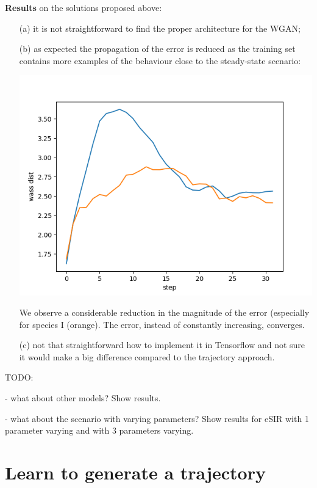 \documentclass{article}
\begin{document}
\textbf{Results} on the solutions proposed above:
\begin{itemize}
    \item[(a)] it is not straightforward to find the proper architecture for the WGAN;
    \item[(b)] as expected the propagation of the error is reduced as the training set contains more examples of the behaviour close to the steady-state scenario:
    \begin{center}
        \includegraphics[scale = 0.4]{img/ENRICH_10ep_avg_wass_distance_32steps.png}
    \end{center}
    We observe a considerable reduction in the magnitude of the error (especially for species I (orange). The error, instead of constantly increasing, converges.
    
    \item[(c)] not that straightforward how to implement it in Tensorflow and not sure it would make a big difference compared to the trajectory approach.
\end{itemize}


TODO:

- what about other models? Show results.

- what about the scenario with varying parameters? Show results for eSIR with 1 parameter varying and with 3 parameters varying.


\section{Learn to generate a trajectory}
\end{document}
